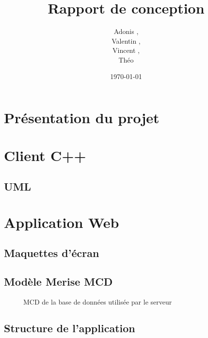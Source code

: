 \documentclass[a4paper]{article}
\title{Rapport de conception}
\author{Adonis \bsc{Najimi},\\
 Valentin \bsc{Stern},\\
 Vincent \bsc{Albert},\\
 Théo \bsc{Gerriet}}
\date{\today}
\begin{document}
\maketitle
\section{Présentation du projet}
\section{Client C++}
\subsection{UML}
\section{Application Web}
\subsection{Maquettes d'écran}
\subsection{Modèle Merise MCD}
\begin{figure}
	\centering
	
	\caption{\label{MCD} MCD de la base de données utilisée par le serveur}
\end{figure}
\subsection{Structure de l'application}
\end{document}
